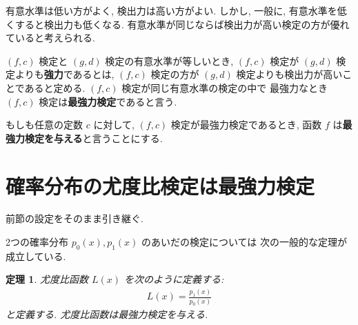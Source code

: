 \documentclass[12pt,twoside]{jarticle}
\theoremstyle{jplain}
\newtheorem{theorem}{定理}
\theoremstyle{jplain}
\theoremstyle{jplain}
\numberwithin{theorem}{section}
\numberwithin{equation}{section}
\numberwithin{figure}{section}
\numberwithin{table}{section}
\begin{document}
有意水準は低い方がよく, 検出力は高い方がよい.
しかし, 一般に, 有意水準を低くすると検出力も低くなる.
有意水準が同じならば検出力が高い検定の方が優れていると考えられる.

$(f,c)$ 検定と $(g,d)$ 検定の有意水準が等しいとき,
$(f,c)$ 検定が $(g,d)$ 検定よりも{\bfseries 強力}であるとは,
$(f,c)$ 検定の方が $(g,d)$ 検定よりも検出力が高いことであると定める.
$(f,c)$ 検定が同じ有意水準の検定の中で
最強力なとき $(f,c)$ 検定は{\bfseries 最強力検定}であると言う.

もしも任意の定数 $c$ に対して, $(f,c)$ 検定が最強力検定であるとき,
函数 $f$ は{\bfseries 最強力検定を与える}と言うことにする.


\section{確率分布の尤度比検定は最強力検定}

前節の設定をそのまま引き継ぐ.

2つの確率分布 $p_0(x),p_1(x)$ のあいだの検定については
次の一般的な定理が成立している.

\begin{theorem}
  尤度比函数 $L(x)$ を次のように定義する:
  \begin{align*}
    L(x) = \frac{p_1(x)}{p_0(x)}
  \end{align*}
  と定義する. 尤度比函数は最強力検定を与える.
\end{theorem}
\end{document}

